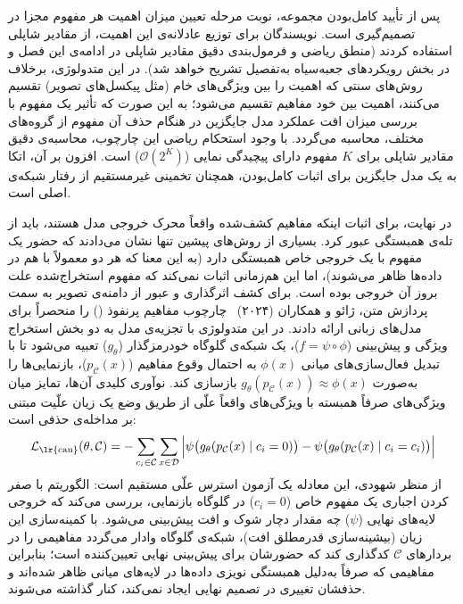 پس از تأیید کامل‌بودن مجموعه، نوبت مرحله تعیین میزان اهمیت هر مفهوم مجزا در تصمیم‌گیری است. نویسندگان برای توزیع عادلانه‌ی این اهمیت، از مقادیر شاپلی استفاده کردند (منطق ریاضی و فرمول‌بندی دقیق مقادیر شاپلی در ادامه‌ی این فصل و در بخش رویکردهای جعبه‌سیاه به‌تفصیل تشریح خواهد شد). در این متدولوژی، برخلاف روش‌های سنتی که اهمیت را بین ویژگی‌های خام (مثل پیکسل‌های تصویر) تقسیم می‌کنند، اهمیت بین خود مفاهیم تقسیم می‌شود؛ به این صورت که تأثیر یک مفهوم با بررسی میزان افت عملکرد مدل جایگزین در هنگام حذف آن مفهوم از گروه‌های مختلف، محاسبه می‌گردد. با وجود استحکام ریاضی این چارچوب، محاسبه‌ی دقیق مقادیر شاپلی برای $K$ مفهوم دارای پیچیدگی نمایی ($\mathcal{O}(2^K)$) است. افزون بر آن، اتکا به یک مدل جایگزین برای اثبات کامل‌بودن، همچنان تخمینی غیرمستقیم از رفتار شبکه‌ی اصلی است.

در نهایت، برای اثبات اینکه مفاهیم کشف‌شده واقعاً محرک خروجی مدل هستند، باید از تله‌ی همبستگی عبور کرد. بسیاری از روش‌های پیشین تنها نشان می‌دادند که حضور یک مفهوم با یک خروجی خاص همبستگی دارد (به این معنا که هر دو معمولاً با هم در داده‌ها ظاهر می‌شوند)، اما این هم‌زمانی اثبات نمی‌کند که مفهوم استخراج‌شده علت بروز آن خروجی بوده است. برای کشف اثرگذاری و عبور از دامنه‌ی تصویر به سمت پردازش متن، ژائو و همکاران (۲۰۲۴)~\cite{zhao2024explaining} چارچوب مفاهیم پرنفوذ () را منحصراً برای مدل‌های زبانی ارائه دادند. در این متدولوژی با تجزیه‌ی مدل به دو بخش استخراج ویژگی و پیش‌بینی ($f = \psi \circ \phi$)، یک شبکه‌ی گلوگاه خودرمزگذار ($g_\theta$) تعبیه می‌شود تا با تبدیل فعال‌سازی‌های میانی $\phi(x)$ به احتمال وقوع مفاهیم ($p_{\mathcal{C}}(x)$)، بازنمایی‌ها را به‌صورت $g_\theta(p_{\mathcal{C}}(x)) \approx \phi(x)$ بازسازی کند. نوآوری کلیدی آن‌ها، تمایز میان ویژگی‌های صرفاً همبسته با ویژگی‌های واقعاً علّی از طریق وضع یک زیان علّیت مبتنی بر مداخله‌ی حذفی است:
\begin{equation}\label{eq:chap3_high_impact_concepts}
    \mathcal{L}_{\text{\lr{cau}}}(\theta, \mathcal{C}) = -\sum_{c_i \in \mathcal{C}} \sum_{x \in \mathcal{D}} \Big| \psi\big(g_\theta(p_{\mathcal{C}}(x) \mid c_i = 0)\big) - \psi\big(g_\theta(p_{\mathcal{C}}(x) \mid c_i = c_i)\big) \Big|
\end{equation}
از منظر شهودی، این معادله یک آزمون استرس علّی مستقیم است: الگوریتم با صفر کردن اجباری یک مفهوم خاص ($c_i = 0$) در گلوگاه بازنمایی، بررسی می‌کند که خروجی لایه‌های نهایی ($\psi$) چه مقدار دچار شوک و افت پیش‌بینی می‌شود. با کمینه‌سازی این زیان (بیشینه‌سازی قدرمطلق افت)، شبکه‌ی گلوگاه وادار می‌گردد مفاهیمی را در بردارهای $\mathcal{C}$ کدگذاری کند که حضورشان برای پیش‌بینی نهایی تعیین‌کننده است؛ بنابراین مفاهیمی که صرفاً به‌دلیل همبستگی نویزی داده‌ها در لایه‌های میانی ظاهر شده‌اند و حذفشان تغییری در تصمیم نهایی ایجاد نمی‌کند، کنار گذاشته می‌شوند.

